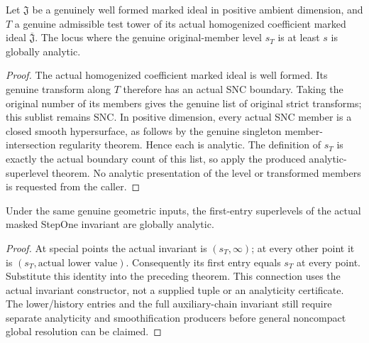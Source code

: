 \begin{theorem}
\label{hir:actual-step-one-level-analytic-superlevels}
\leanok
Let $\mathfrak J$ be a genuinely well formed marked ideal in positive
ambient dimension, and $T$ a genuine admissible test tower of its actual
homogenized coefficient marked ideal $\overline{\mathfrak J}$. The locus
where the genuine original-member level $s_T$ is at least $s$ is globally
analytic.
\end{theorem}
\begin{proof}
The actual homogenized coefficient marked ideal is well formed. Its
genuine transform along $T$ therefore has an actual SNC boundary. Taking
the original number of its members gives the genuine list of original
strict transforms; this sublist remains SNC. In positive dimension,
every actual SNC member is a closed smooth hypersurface, as follows by
the genuine singleton member-intersection regularity theorem. Hence each
is analytic. The definition of $s_T$ is exactly the actual boundary count
of this list, so apply the produced analytic-superlevel theorem. No
analytic presentation of the level or transformed members is requested
from the caller.
\end{proof}

\begin{corollary}
\label{hir:actual-masked-step-one-first-entry-analytic-superlevels}
\leanok
Under the same genuine geometric inputs, the first-entry superlevels of
the actual masked StepOne invariant are globally analytic.
\end{corollary}
\begin{proof}
At special points the actual invariant is $(s_T,\infty)$; at every other
point it is $(s_T,\text{actual lower value})$. Consequently its first
entry equals $s_T$ at every point. Substitute this identity into the
preceding theorem. This connection uses the actual invariant constructor,
not a supplied tuple or an analyticity certificate. The lower/history
entries and the full auxiliary-chain invariant still require separate
analyticity and smoothification producers before general noncompact
global resolution can be claimed.
\end{proof}
